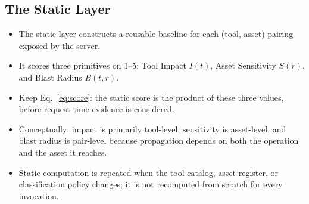 \subsection{The Static Layer}
\label{sec:static}
\begin{itemize}
  \item The static layer constructs a reusable baseline for each (tool, asset)
        pairing exposed by the server.
  \item It scores three primitives on 1--5: Tool Impact $I(t)$, Asset
        Sensitivity $S(r)$, and Blast Radius $B(t,r)$.
  \item Keep Eq.~\ref{eq:score}: the static score is the product of these three
        values, before request-time evidence is considered.
  \item Conceptually: impact is primarily tool-level, sensitivity is
        asset-level, and blast radius is pair-level because propagation depends
        on both the operation and the asset it reaches.
  \item Static computation is repeated when the tool catalog, asset register, or
        classification policy changes; it is not recomputed from scratch for
        every invocation.
\end{itemize}

